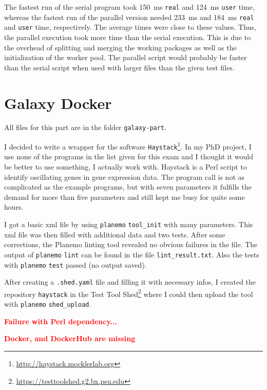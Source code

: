 \documentclass[paper=a4, 12pt]{scrartcl}
\newcommand{\xxx}[1]{\textbf{\textcolor{red}{#1}}}	%
\begin{document}
The fastest run of the serial program took 150~ms \texttt{real} and 124~ms \texttt{user} time, whereas the fastest run of the parallel version needed 233~ms and 184~ms \texttt{real} and \texttt{user} time, respectively. The average times were close to these values. Thus, the parallel execution took more time than the serial execution. This is due to the overhead of splitting and merging the working packages as well as the initialization of the worker pool. The parallel script would probably be faster than the serial script when used with larger files than the given test files.

\section{Galaxy Docker}

All files for this part are in the folder \texttt{galaxy-part}.

I decided to write a wrapper for the software \texttt{Haystack}\footnote{\url{http://haystack.mocklerlab.org}}. In my PhD project, I use none of the programs in the list given for this exam and I thought it would be better to use something, I actually work with. Haystack is a Perl script to identify oscillating genes in gene expression data. The program call is not as complicated as the example programs, but with seven parameters it fulfills the demand for more than five parameters and still kept me busy for quite some hours.

I got a basic xml file by using \texttt{planemo} \texttt{tool\_init} with many parameters. This xml file was then filled with additional data and two tests. After some corrections, the Planemo linting tool revealed no obvious failures in the file. The output of \texttt{planemo} \texttt{lint} can be found in the file \texttt{lint\_result.txt}. Also the tests with \texttt{planemo} \texttt{test} passed (no output saved).

After creating a \texttt{.shed.yaml} file and filling it with necessary infos, I created the repository \texttt{haystack} in the Test Tool Shed\footnote{\url{https://testtoolshed.g2.bx.psu.edu}} where I could then upload the tool with \texttt{planemo} \texttt{shed\_upload}.

\xxx{Failure with Perl dependency...}

\xxx{Docker, and DockerHub are missing}
\end{document}

